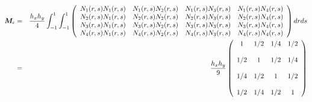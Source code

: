 \begin{eqnarray}
{\bm M}_e 
&=&   \frac{h_xh_y}{4} \int_{-1}^1 \int_{-1}^{1}
\left(
\begin{array}{cccc}
N_1(r,s)N_1(r,s) &  N_1(r,s)N_2(r,s) &  N_1(r,s)N_3(r,s) & N_1(r,s)N_4(r,s) \\
N_2(r,s)N_1(r,s) &  N_2(r,s)N_2(r,s) &  N_2(r,s)N_3(r,s) & N_2(r,s)N_4(r,s) \\
N_3(r,s)N_1(r,s) &  N_3(r,s)N_2(r,s) &  N_3(r,s)N_3(r,s) & N_3(r,s)N_4(r,s) \\
N_4(r,s)N_1(r,s) &  N_4(r,s)N_2(r,s) &  N_4(r,s)N_3(r,s) & N_4(r,s)N_4(r,s) 
\end{array}
\right)
dr ds\nonumber\\
&=&
\frac{h_x h_y}{9}
\left(
\begin{array}{cccc}
1 & 1/2 & 1/4 & 1/2 \\ \\ 
1/2 & 1   & 1/2 & 1/4 \\ \\
1/4 & 1/2 & 1 & 1/2 \\ \\
1/2 & 1/4 & 1/2 & 1  
\end{array}
\right)
\end{eqnarray}


